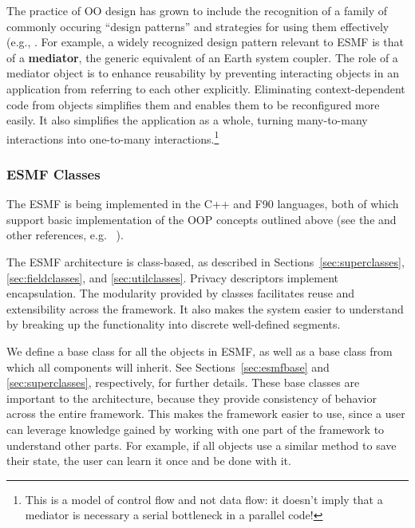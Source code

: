 The practice of OO design has grown to include the recognition of a family
of commonly occuring ``design patterns'' and strategies for using them 
effectively (e.g., \cite{alexandrescu, gamma}.  For example, a widely
recognized design pattern relevant to ESMF is that of a {\bf mediator},
the generic equivalent of an Earth system coupler.  The role of a 
mediator object is to enhance reusability by preventing interacting objects 
in an application from referring to each other explicitly.  Eliminating 
context-dependent code from objects simplifies them and enables them to be 
reconfigured more easily.   It also simplifies the application as a whole, turning 
many-to-many interactions into one-to-many interactions.\footnote{This is a 
model of control flow and not data flow:  it doesn't imply that a 
mediator is necessary a serial bottleneck in a parallel code!}  

\subsubsection{ESMF Classes}

The ESMF is being implemented in the C++ and F90 languages, both of which support 
basic implementation of the OOP concepts outlined above (see the  \cite{bib:ESMFimplrep}
and other references, e.g. ~\cite{decyk97, decyk00}).  

The ESMF architecture is class-based, as described in Sections~\ref{sec:superclasses}, 
\ref{sec:fieldclasses}, and \ref{sec:utilclasses}.  Privacy descriptors 
implement encapsulation.  The modularity provided by classes facilitates reuse
and extensibility across the framework.  It also makes the system easier to 
understand by breaking up the functionality into discrete well-defined segments.

We define a base class for all the objects in ESMF, as well as a base class 
from which all components will inherit.  See Sections~\ref{sec:esmfbase} and 
\ref{sec:superclasses}, respectively, for further details.  These base
classes are important to the architecture, because they provide consistency
of behavior across the entire framework.  This makes the framework easier
to use, since a user can leverage knowledge gained by working with one
part of the framework to understand other parts.  For example, if all
objects use a similar method to save their state, the user can learn it 
once and be done with it.

